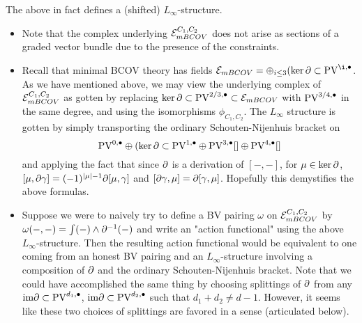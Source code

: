 \documentclass[11pt]{article}
\begin{document}
\begin{prop}
The above in fact defines a (shifted) $L_\infty$-structure.
\end{prop}

\begin{rmk}
\begin{itemize}
\item Note that the complex underlying $\mathcal{E}_{mBCOV}^{C_1,C_2}$ does not arise as sections of a graded vector bundle due to the presence of the constraints.
\item Recall that minimal BCOV theory has fields $\mc E_{mBCOV}=\oplus_{i\leq 3} (\ker\del\subset\PV^{\i,\bullet}$. As we have mentioned above, we may view the underlying complex of $\mathcal{E}_{mBCOV}^{C_1,C_2}$ as gotten by replacing $\ker\partial\subset\text{PV}^{2/3,\bullet}\subset\mathcal{E}_{mBCOV}$ with $\text{PV}^{3/4,\bullet}$ in the same degree, and using the isomorphisms $\phi_{C_1,C_2}$. The $L_\infty$ structure is gotten by simply transporting the ordinary Schouten-Nijenhuis bracket on \[\text{PV}^{0,\bullet}\oplus(\ker\partial\subset\text{PV}^{1,\bullet}\oplus\text{PV}^{3,\bullet}[]\oplus\text{PV}^{4,\bullet}[]\] and applying the fact that since $\partial$ is a derivation of $[-,-]$, for $\mu\in\ker\partial$, $[\mu,\partial\gamma]=(-1)^{|\mu|-1}\partial[\mu,\gamma]$ and $[\partial\gamma,\mu]=\partial[\gamma,\mu]$. Hopefully this demystifies the above formulas.
\item Suppose we were to naively try to define a BV pairing $\omega$ on $\mathcal{E}_{mBCOV}^{C_1,C_2}$ by $\omega(-,-)=\int (-)\wedge\partial^{-1}(-)$ and write an "action functional" using the above $L_\infty$-structure. Then the resulting action functional would be equivalent to one coming from an honest BV pairing and an $L_\infty$-structure involving a composition of $\partial$ and the ordinary Schouten-Nijenhuis bracket. Note that we could have accomplished the same thing by choosing splittings of $\partial$ from any $\text{im}\partial\subset \text{PV}^{d_1,\bullet}$, $\text{im}\partial\subset\text{PV}^{d_2,\bullet}$ such that $d_1+d_2\neq d-1$. However, it seems like these two choices of splittings are favored in a sense (articulated below). 
\end{itemize}
\end{rmk}
\fi
\end{document}
